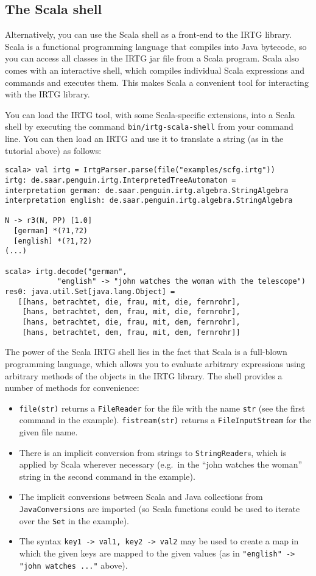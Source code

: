 \documentclass[11pt]{article}
\begin{document}
\subsection{The Scala shell}

Alternatively, you can use the Scala shell as a front-end to the IRTG
library. Scala is a functional programming language that compiles into
Java bytecode, so you can access all classes in the IRTG jar file from
a Scala program. Scala also comes with an interactive shell, which
compiles individual Scala expressions and commands and executes
them. This makes Scala a convenient tool for interacting with the IRTG
library.

You can load the IRTG tool, with some Scala-specific extensions, into
a Scala shell by executing the command \verb?bin/irtg-scala-shell?
from your command line.  You can then load an IRTG and use it to
translate a string (as in the tutorial above) as follows:

\begin{verbatim}
scala> val irtg = IrtgParser.parse(file("examples/scfg.irtg"))
irtg: de.saar.penguin.irtg.InterpretedTreeAutomaton = 
interpretation german: de.saar.penguin.irtg.algebra.StringAlgebra
interpretation english: de.saar.penguin.irtg.algebra.StringAlgebra

N -> r3(N, PP) [1.0]
  [german] *(?1,?2)
  [english] *(?1,?2)
(...)

scala> irtg.decode("german", 
            "english" -> "john watches the woman with the telescope")
res0: java.util.Set[java.lang.Object] = 
   [[hans, betrachtet, die, frau, mit, die, fernrohr], 
    [hans, betrachtet, dem, frau, mit, die, fernrohr], 
    [hans, betrachtet, die, frau, mit, dem, fernrohr], 
    [hans, betrachtet, dem, frau, mit, dem, fernrohr]]
\end{verbatim}

The power of the Scala IRTG shell lies in the fact that Scala is a
full-blown programming language, which allows you to evaluate
arbitrary expressions using arbitrary methods of the objects in the
IRTG library. The shell provides a number of methods for convenience:
\begin{itemize}
\item \verb?file(str)? returns a \verb?FileReader? for the file with
  the name \verb?str? (see the first command in the
  example). \verb?fistream(str)? returns a \verb?FileInputStream? for
  the given file name.
\item There is an implicit conversion from strings to
  \verb?StringReader?s, which is applied by Scala wherever necessary
  (e.g.\ in the ``john watches the woman'' string in the second
  command in the example).
\item The implicit conversions between Scala and Java collections from
  \verb?JavaConversions? are imported (so Scala functions could be
  used to iterate over the \verb?Set? in the example).
\item The syntax \verb?key1 -> val1, key2 -> val2? may be used to
  create a map in which the given keys are mapped to the given
  values (as in \verb?"english" -> "john watches ..."? above).
\end{itemize}
\end{document}
